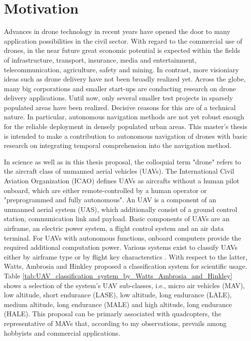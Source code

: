 \chapter{Motivation}

Advances in drone technology in recent years
have opened the door to many application possibilities in the civil sector. \cite{MunichRE}
With regard to the commercial use of drones, 
in the near future great economic potential is expected within the fields of
infrastructure,
transport,
insurance,
media and entertainment,
telecommunication,
agriculture,
safety
and mining. \cite{PwC2016}
In contrast,
more visioniary ideas such as drone delivery
have not been broadly realized yet. \cite{Rosen2019}
Across the globe, many big corporations and smaller start-ups 
are conducting research on drone delivery applications. \cite{Garcia2019}
Until now, only several smaller
test projects in sparsely populated areas have been realized. 
Decisive reasons for this are of a technical nature. 
In particular, autonomous navigation methods are not yet 
robust enough for the reliable deployment in densely populated urban areas. \cite{loquercio2018learning}
This master's thesis is intended to make a contribution to autonomous navigation of drones with basic research on 
integrating temporal comprehension into the navigation method.


In science as well as in this thesis proposal, the colloquial term "drone" refers
to the aircraft class of unmanned aerial vehicles (UAVs).
The International Civil Aviation Organization (ICAO) \cite{ICAO2005} defines UAVs
as aircrafts without a human pilot onboard, which are either remote-controlled by a human operator or "preprogrammed and fully autonomous".
An UAV is a component of an unmanned aerial system (UAS), which additionally consist of a ground control station, communication link and payload. 
Basic components of UAVs are an airframe, an electric power system, a flight
control system and an air data terminal. \cite{Fahlstrom2012}
For UAVs with autonomous functions, onboard computers
provide the required additional computation power.
Various systems exist to classify UAVs either by 
airframe type \cite{Austin2011} or by flight key characterstics \cite{USDOD2011, Wei2016}.
With respect to the latter, 
Watts, Ambrosia and Hinkley \cite{Watts2012} proposed a classification system 
for scientific usage.
Table \ref{tab:UAV_classification_system_by_Watts_Ambrosia_and_Hinkley} shows a selection of the system's UAV sub-classes, 
i.e., micro air vehicles (MAV), low altitude, short endurance (LASE),
low altitude, long endurance (LALE), medium altitude, long endurance (MALE) and
high altitude, long endurance (HALE).
This proposal can be primarly associated with
quadcopters, the representative of MAVs
that, according to my observations, prevails among hobbyists and commercial applications.



